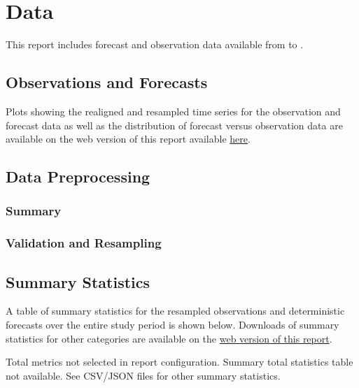 \documentclass[12pt,letterpaper]{article}
\begin{document}
\section{Data}

This report includes forecast and observation data available from
 to .

\subsection{Observations and Forecasts}


Plots showing the realigned and resampled time series for the observation and
forecast data as well as the distribution of forecast versus observation
data are available on the web version of this report available
\href{\VAR{report_url}}{here}.


\subsection{Data Preprocessing}

\subsubsection{Summary}


\subsubsection{Validation and Resampling}


\subsection{Summary Statistics}

A table of summary statistics for the resampled observations and deterministic
forecasts over the entire study period is shown below. Downloads of summary
statistics for other categories are available on the
\href{\VAR{report_url}}{web version of this report}.

  Total metrics not selected in report configuration. Summary total statistics table not available. See CSV/JSON files for other summary statistics.
\end{document}
